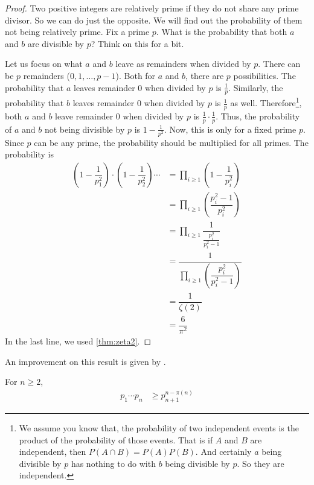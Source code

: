 \documentclass{subfiles}
\begin{document}
	\begin{proof}
		Two positive integers are relatively prime if they do not share any prime divisor. So we can do just the opposite. We will find out the probability of them not being relatively prime. Fix a prime $p$. What is the probability that both $a$ and $b$ are divisible by $p$? Think on this for a bit.

		Let us focus on what $a$ and $b$ leave as remainders when divided by $p$. There can be $p$ remainders ($0,1,\ldots,p-1$). Both for $a$ and $b$, there are $p$ possibilities. The probability that $a$ leaves remainder $0$ when divided by $p$ is $\frac{1}{p}$. Similarly, the probability that $b$ leaves remainder $0$ when divided by $p$ is $\frac{1}{p}$ as well. Therefore\footnote{We assume you know that, the probability of two independent events is the product of the probability of those events. That is if $A$ and $B$ are independent, then $P(A\cap B)=P(A)P(B)$. And certainly $a$ being divisible by $p$ has nothing to do with $b$ being divisible by $p$. So they are independent.}, both $a$ and $b$ leave remainder $0$ when divided by $p$ is $\frac{1}{p}\cdot\frac{1}{p}$. Thus, the probability of $a$ and $b$ not being divisible by $p$ is $1-\frac{1}{p^2}$. Now, this is only for a fixed prime $p$. Since $p$ can be any prime, the probability should be multiplied for all primes. The probability is
			\begin{align*}
				\left(1-\dfrac{1}{p_1^2}\right)\cdot\left(1-\dfrac{1}{p_2^2}\right)\cdots
				& = \prod_{i\geq1}\left(1-\dfrac{1}{p_i^2}\right)\\
				& = \prod_{i\geq1}\left(\dfrac{p_i^2-1}{p_i^2}\right)\\
				& = \prod_{i\geq1}\dfrac{1}{\frac{p_i^2}{p_i^2-1}}\\
				& = \dfrac{1}{\prod_{i\geq1}\left(\dfrac{p_i^2}{p_i^2-1}\right)}\\
				& = \dfrac{1}{\zeta(2)}\\
				& = \dfrac{6}{\pi^2}
			\end{align*}
		In the last line, we used \autoref{thm:zeta2}.
	\end{proof}

	An improvement on this result is given by \textcite{panaitopol_2000}.
		\begin{theorem}
			For $n\geq 2$,
				\begin{align*}
					p_{1}\cdots p_{n}
						& \geq p_{n+1}^{n-\pi(n)}
				\end{align*}
		\end{theorem}
\end{document}
